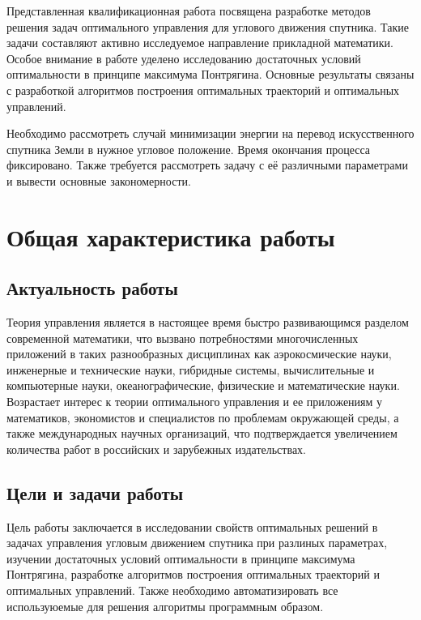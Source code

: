 \documentclass[14pt]{extreport}
\begin{document}


\tableofcontents

\intro

Представленная квалификационная работа посвящена разработке методов решения задач оптимального управления для углового движения спутника.
Такие задачи составляют активно исследуемое направление прикладной математики.
Особое внимание в работе уделено исследованию достаточных условий оптимальности в
принципе максимума Понтрягина. Основные результаты связаны с разработкой алгоритмов построения оптимальных траекторий и оптимальных управлений. 

Необходимо рассмотреть случай минимизации энергии на перевод искусственного спутника Земли в нужное угловое положение.
Время окончания процесса фиксировано. Также требуется рассмотреть задачу с её различными параметрами и вывести основные закономерности.

\chapter{Общая характеристика работы}

\section{Актуальность работы}

Теория управления является в настоящее время быстро развивающимся разделом современной математики, что
вызвано потребностями многочисленных приложений в таких разнообразных
дисциплинах как аэрокосмические науки, инженерные и технические науки, гибридные
системы, вычислительные и
компьютерные науки, океанографические, физические и математические науки. Возрастает интерес к теории оптимального управления
и ее приложениям у математиков, экономистов и специалистов по проблемам окружающей среды, а также международных научных организаций, что
подтверждается увеличением количества работ в российских и зарубежных издательствах.

\section{Цели и задачи работы}

Цель работы заключается в исследовании свойств оптимальных решений в
задачах управления угловым движением спутника при разлиных параметрах, изучении достаточных условий оптимальности в принципе максимума Понтрягина,
разработке алгоритмов построения оптимальных траекторий и оптимальных управлений. Также необходимо автоматизировать все используюемые для решения алгоритмы программным образом.
\end{document}
